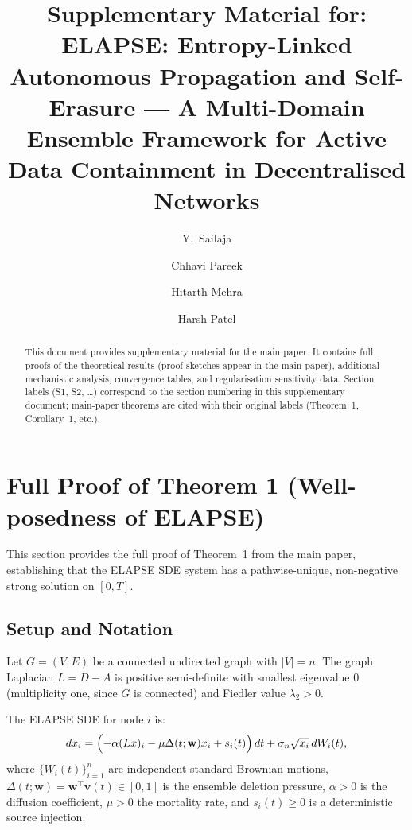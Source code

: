 \documentclass[review,12pt]{elsarticle}
\newcommand{\bfw}{\mathbf{w}}
\newcommand{\bfv}{\mathbf{v}}
\newcommand{\lambdat}{\lambda_2}
\begin{document}
\begin{frontmatter}

\title{Supplementary Material for:\\
ELAPSE: Entropy-Linked Autonomous Propagation and Self-Erasure ---
A Multi-Domain Ensemble Framework for Active Data Containment
in Decentralised Networks}

\author[rv]{Y.~Sailaja}
\author[rv]{Chhavi Pareek}
\author[rv]{Hitarth Mehra}
\author[rv]{Harsh Patel}

\address[rv]{Department of Mathematics / Department of Computer Science \&
             Engineering, RV College of Engineering, Bangalore 560059, India}

\begin{abstract}
This document provides supplementary material for the main paper.
It contains full proofs of the theoretical results (proof sketches appear
in the main paper), additional mechanistic analysis, convergence tables,
and regularisation sensitivity data.  Section labels (S1, S2, \ldots)
correspond to the section numbering in this supplementary document;
main-paper theorems are cited with their original labels
(Theorem~1, Corollary~1, etc.).
\end{abstract}

\end{frontmatter}

\section{Full Proof of Theorem 1 (Well-posedness of ELAPSE)}
\label{sec:S_wellposed}

This section provides the full proof of Theorem~1 from the main paper,
establishing that the ELAPSE SDE system has a pathwise-unique, non-negative
strong solution on $[0,T]$.

\subsection{Setup and Notation}

Let $G = (V, E)$ be a connected undirected graph with $|V| = n$.  The
graph Laplacian $L = D - A$ is positive semi-definite with smallest
eigenvalue $0$ (multiplicity one, since $G$ is connected) and
Fiedler value $\lambdat > 0$.

The ELAPSE SDE for node $i$ is:
\begin{equation}
  dx_i = \Bigl(-\alpha (Lx)_i - \mu\Delta(t;\bfw)x_i + s_i(t)\Bigr)\,dt
         + \sigma_n \sqrt{x_i}\,dW_i(t),
  \label{eq:S_sde}
\end{equation}
where $\{W_i(t)\}_{i=1}^n$ are independent standard Brownian motions,
$\Delta(t;\bfw) = \bfw^\top \bfv(t) \in [0,1]$ is the ensemble
deletion pressure, $\alpha > 0$ is the diffusion coefficient,
$\mu > 0$ the mortality rate, and $s_i(t) \geq 0$ is a deterministic
source injection.
\end{document}
